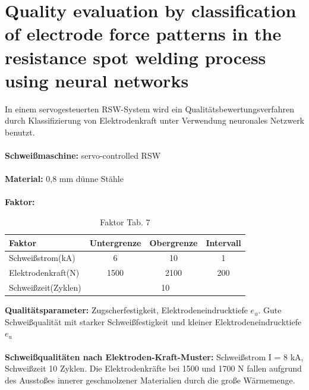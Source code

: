 \documentclass[english,ngerman]{tudscrreprt}
\begin{document}
\section{Quality evaluation by classification of electrode force patterns in the resistance spot welding process using neural networks\cite{Park.2004}}
In einem servogesteuerten RSW-System wird ein Qualitätsbewertungsverfahren durch Klassifizierung von Elektrodenkraft unter Verwendung neuronales Netzwerk benutzt.\\
\\
\textbf{Schweißmaschine: }servo-controlled RSW\\
\\
\textbf{Material: }0,8 mm dünne Stähle \\
\\
\textbf{Faktor: }\\
\begin{table}[H]
\caption{Faktor Tab. 7}
\begin{flushleft}
	\begin{tabular}{lccc} 
		\toprule
 		\textbf{Faktor} & \textbf{Untergrenze} & \textbf{Obergrenze}&\textbf{Intervall}\\
		\midrule
		Schweißstrom(kA) & 6 & 10 & 1\\

		Elektrodenkraft(N) & 1500 & 2100 & 200\\

		Schweißzeit(Zyklen) & \multicolumn{3}{c}{10} \\
		\bottomrule
	\end{tabular}
\end{flushleft}
\end{table}
\noindent
\textbf{Qualitätsparameter: }Zugscherfestigkeit, Elektrodeneindrucktiefe $e_{u}$. Gute Schweißqualität mit starker Schweißfestigkeit und kleiner Elektrodeneindrucktiefe $e_{u}$\\
\\
\textbf{Schweißqualitäten nach Elektroden-Kraft-Muster: }Schweißstrom I = 8 kA, Schweißzeit 10 Zyklen. Die Elektrodenkräfte bei 1500 und 1700 N fallen aufgrund des Ausstoßes innerer geschmolzener Materialien durch die große Wärmemenge. 
\end{document}
